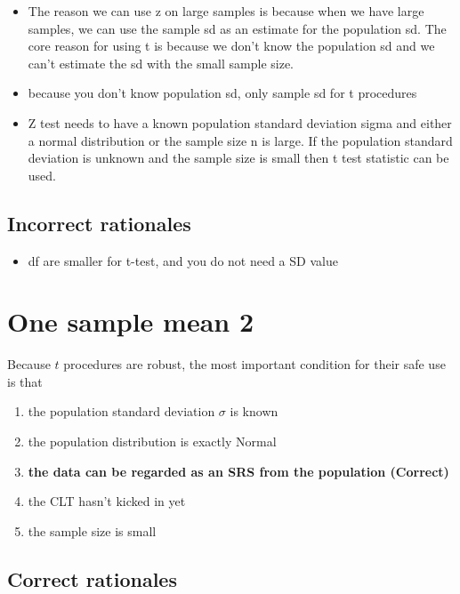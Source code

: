 \documentclass[letterpaper,9pt,twoside,printwatermark=false]{pinp}
\providecommand{\tightlist}{%
  \setlength{\itemsep}{0pt}\setlength{\parskip}{0pt}}
\begin{document}
\begin{itemize}
\tightlist
\item
  The reason we can use z on large samples is because when we have large
  samples, we can use the sample sd as an estimate for the population
  sd. The core reason for using t is because we don't know the
  population sd and we can't estimate the sd with the small sample size.
\item
  because you don't know population sd, only sample sd for t procedures
\item
  Z test needs to have a known population standard deviation sigma and
  either a normal distribution or the sample size n is large. If the
  population standard deviation is unknown and the sample size is small
  then t test statistic can be used.
\end{itemize}

\subsection{Incorrect rationales}\label{incorrect-rationales-4}

\begin{itemize}
\tightlist
\item
  df are smaller for t-test, and you do not need a SD value
\end{itemize}

\section{One sample mean 2}\label{one-sample-mean-2}

Because \(t\) procedures are robust, the most important condition for
their safe use is that

\begin{enumerate}
\def\labelenumi{\alph{enumi}.}
\tightlist
\item
  the population standard deviation \(\sigma\) is known
\item
  the population distribution is exactly Normal
\item
  \textbf{the data can be regarded as an SRS from the population
  (Correct)}
\item
  the CLT hasn't kicked in yet
\item
  the sample size is small
\end{enumerate}

\subsection{Correct rationales}\label{correct-rationales-5}
\end{document}
